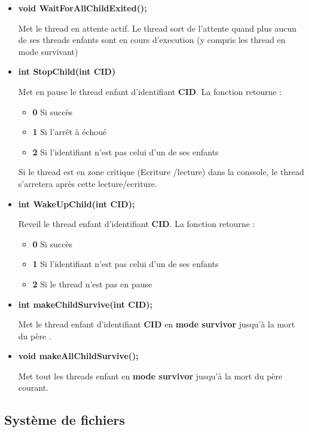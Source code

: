 \documentclass{article}
\begin{document}
\begin{itemize}
  \item 
  \textbf{void WaitForAllChildExited();}
  
  Met le thread en attente actif. Le thread sort de l'attente quand plus aucun de ses threads enfants sont en cours d'execution (y compris les thread en mode survivant)
  
  \item 
  \textbf{int StopChild(int CID)}
  
  Met en pause le thread enfant d'identifiant \textbf{CID}. 
  La fonction retourne :    
    \begin{itemize}
      \item \textbf{0} Si succès
      \item \textbf{1} Si l'arrêt à échoué
      \item \textbf{2} Si l'identifiant n'est pas celui d'un de ses enfants
    \end{itemize} 
    Si le thread est en zone critique (Ecriture /lecture) dans la conssole, le thread s'arretera après cette lecture/ecriture.      
    
  
  \item 
  \textbf{int WakeUpChild(int CID);}
  
    
  Reveil le thread enfant d'identifiant \textbf{CID}. 
  La fonction retourne :    
    \begin{itemize}
      \item \textbf{0} Si succès
      \item \textbf{1} Si l'identifiant n'est pas celui d'un de ses enfants
      \item \textbf{2} Si le thread n'est pas en pause
    \end{itemize} 
    
  
  \item 
  \textbf{int makeChildSurvive(int CID);}
  
  Met le thread enfant d'identifiant \textbf{CID} en \textbf{mode survivor} jusqu'à la mort du père .
  
  \item 
  \textbf{void makeAllChildSurvive();}
  
  Met tout les threads enfant en \textbf{mode survivor} jusqu'à la mort du père courant.
\end{itemize}

\subsection{Système de fichiers}
\end{document}
